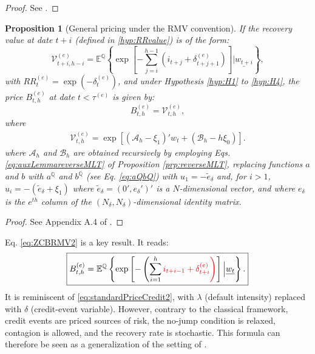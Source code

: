 \documentclass[
  12pt,
]{book}
\newtheorem{proposition}{Proposition}[chapter]
\theoremstyle{definition}
\theoremstyle{definition}
\theoremstyle{definition}
\theoremstyle{definition}
\theoremstyle{remark}
\begin{document}
\begin{proof}
See \citet{Monfort_Pegoraro_Renne_Roussellet_2021}.
\end{proof}

\begin{proposition}[General pricing under the RMV convention]
\protect\hypertarget{prp:generalRMV}{}\label{prp:generalRMV}If the recovery value at date \(t+i\) (defined in \ref{hyp:RRvalue}) is of the form:
\begin{equation}
\mathcal{V}^{(e)}_{t+i, h-i} =
\mathbb{E}^{\mathbb{Q}} \left\{ \exp \left[ - \sum_{j = i}^{h-1} \left(i_{t+j} + \delta^{(e)}_{t+j+1} \right) \right]  \Big|  \underline{w_{t+i}} \right\},\label{eq:ZCBRMV1}
\end{equation}
with \(RR_t^{(e)} = \exp(-\delta_t^{(e)})\), and under Hypothesis \ref{hyp:H1} to \ref{hyp:H4}, the price \(B^{(e)}_{t,h}\) at date \(t < \tau^{(e)}\) is given by:
\begin{equation}
B^{(e)}_{t,h} = \mathcal{V}^{(e)}_{t, h},\label{eq:ZCBRMV2}
\end{equation}
where
\begin{equation}
\begin{array}{lll}
\mathcal{V}^{(e)}_{t, h} = \exp \left[ \left( \mathcal{A}_h - \xi_1 \right) ' w_t + \left( \mathcal{B}_h - h   \xi_0 \right) \right].
\end{array}\label{eq:ZCBRMVformula}
\end{equation}
where \(\mathcal{A}_h\) and \(\mathcal{B}_h\) are obtained recursively by employing Eqs. \eqref{eq:auxLemmareverseMLT} of Proposition \ref{prp:reverseMLT}, replacing functions \(a\) and \(b\) with \(a^{\mathbb{Q}}\) and \(b^{\mathbb{Q}}\) (see Eq. \eqref{eq:aQbQ}) with \(u_{1} = - \widetilde{e}_{\delta}\) and, for \(i>1\), \(u_i = - (\widetilde{e}_{\delta} + \xi_1)\) where \(\widetilde{e}_{\delta} = (0',e_{\delta}')'\) is a \(N\)-dimensional vector, and where \(e_{\delta}\) is the \(e^{th}\) column of the \((N_{\delta}, N_{\delta})\)-dimensional identity matrix.
\end{proposition}

\begin{proof}
See Appendix A.4 of \citet{Monfort_Pegoraro_Renne_Roussellet_2021}.
\end{proof}

Eq. \eqref{eq:ZCBRMV2} is a key result. It reads:
\begin{equation}
\boxed{B^{(e)}_{t,h} = \mathbb{E}^{\mathbb{Q}} \left\{ \exp \left[ -  \left( \sum_{i = 1}^{h}\color{red}{i_{t+i-1} + \delta^{(e)}_{t+i}} \right) \right]  \Big|  \underline{w_{t}} \right\}.}\label{eq:ZCBRMVformula2}
\end{equation}
It is reminiscent of \eqref{eq:standardPriceCredit2}, with \(\lambda\) (default intensity) replaced with \(\delta\) (credit-event variable). However, contrary to the classical framework, credit events are priced sources of risk, the no-jump condition is relaxed, contagion is allowed, and the recovery rate is stochastic. This formula can therefore be seen as a generalization of the setting of \citet{Duffie_Singleton_1999}.
\end{document}
